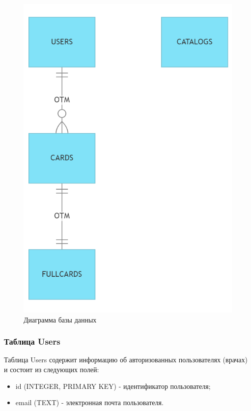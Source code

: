 \begin{figure}
  \includegraphics[scale=0.6]{inc/db.png}
  \caption{Диаграмма базы данных}
  \label{fig:figdb}
\end{figure}

\subsubsection{Таблица Users}

Таблица Users содержит информацию об авторизованных пользователях (врачах) и состоит из следующих полей:
\begin{itemize}
    \item id (INTEGER, PRIMARY KEY) - идентификатор пользователя;
    \item email (TEXT) - электронная почта пользователя. 
\end{itemize}

